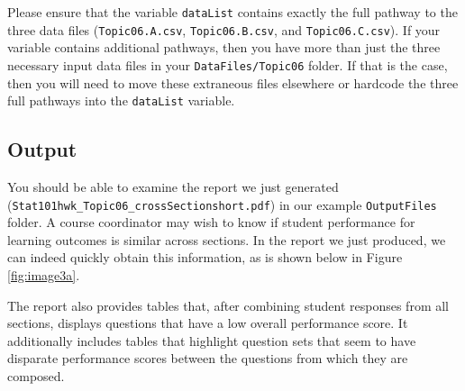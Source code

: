 \documentclass[11pt,a4paper,oldfontcommands,openany]{memoir}
\numberwithin{equation}{section} %
\begin{document}
Please ensure that the variable \texttt{dataList} contains exactly the full pathway to the three data files (\texttt{Topic06.A.csv}, \texttt{Topic06.B.csv}, and \texttt{Topic06.C.csv}). If your variable contains additional pathways, then you have more than just the three necessary input data files in your \texttt{DataFiles/Topic06} folder. If that is the case, then you will need to move these extraneous files elsewhere or hardcode the three full pathways into the \texttt{dataList} variable. 

\subsection{Output}

You should be able to examine the report we just generated (\texttt{Stat101hwk\_Topic06\_crossSection\-short.pdf}) in our example \texttt{OutputFiles} folder. A course coordinator may wish to know if student performance for learning outcomes is similar across sections. In the report we just produced, we can indeed quickly obtain this information, as is shown below in Figure \ref{fig:image3a}.

\begin{center}
\captionsetup{width=0.6\textwidth}
\label{fig:image3a}
\end{center}

The report also provides tables that, after combining student responses from all sections, displays questions that have a low overall performance score. It additionally includes tables that highlight question sets that seem to have disparate performance scores between the questions from which they are composed.
\end{document}
